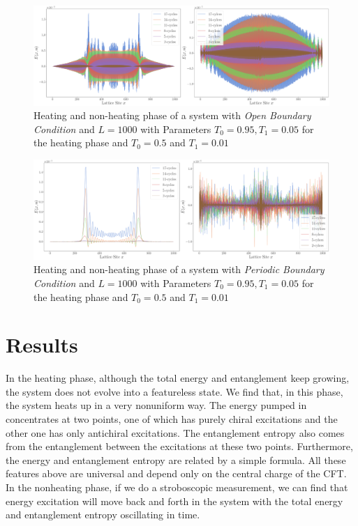 \documentclass[11pt, a4paper]{article}
\theoremstyle{definition} %
\begin{document}
	\begin{figure}[h]
		\centering
		\includegraphics[width=\textwidth]{Energy_Density_Combined_OBC}
		\caption{Heating and non-heating phase of a system with \textit{Open Boundary Condition} and $L=1000$ with Parameters $T_0 = 0.95, T_1 = 0.05$ for the heating phase and $T_0 = 0.5$ and $T_1 = 0.01$}
	\end{figure}
	
	\begin{figure}[h]
		\centering
		\includegraphics[width =\textwidth]{Energy_Density_Combined_PBC}
		\caption{Heating and non-heating phase of a system with \textit{Periodic Boundary Condition} and $L=1000$ with Parameters $T_0 = 0.95, T_1 = 0.05$ for the heating phase and $T_0 = 0.5$ and $T_1 = 0.01$}
	\end{figure}
	
	

\section{Results}

In the heating phase, although the total energy and entanglement keep growing, the system does not evolve into a featureless state. We find that, in this phase, the system heats up in a very nonuniform way. The energy pumped in concentrates at two points, one of which has purely chiral excitations and the other one has only antichiral excitations. The entanglement entropy also comes from the entanglement between the excitations at these two points. Furthermore, the energy and entanglement entropy are related by a simple formula. All these features above are universal and depend only on the central charge of the CFT. In the nonheating phase, if we do a stroboscopic measurement, we can find that energy excitation will move back and forth in the system with the total energy and entanglement entropy oscillating in time.
	
	
\printbibliography[heading=bibintoc,title={Bibliography}]
\end{document}
